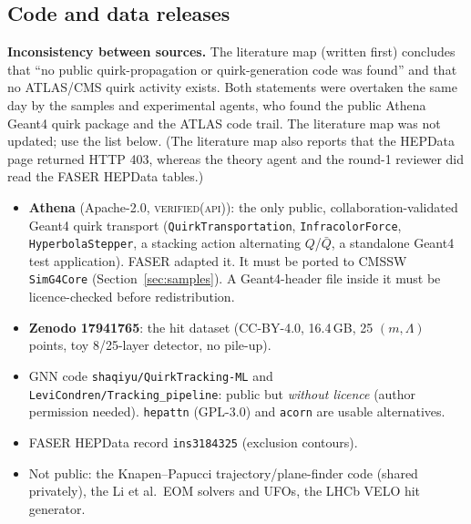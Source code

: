 \documentclass[11pt,a4paper]{article}
\newcommand{\VAPI}{\textsc{verified(api)}}
\DeclareRobustCommand{\file}[1]{\path{#1}}
\begin{document}
\subsection{Code and data releases}
\begin{caution}
\textbf{Inconsistency between sources.} The literature map (written first) concludes that ``no public quirk-propagation or quirk-generation code was found'' and that no ATLAS/CMS quirk activity exists. Both statements were overtaken the same day by the samples and experimental agents, who found the public Athena Geant4 quirk package and the ATLAS code trail. The literature map was not updated; use the list below. (The literature map also reports that the HEPData page returned HTTP 403, whereas the theory agent and the round-1 reviewer did read the FASER HEPData tables.)
\end{caution}
\begin{itemize}
\item \textbf{Athena \file{Simulation/G4Extensions/Quirks}} (Apache-2.0, \VAPI): the only public, collaboration-validated Geant4 quirk transport (\texttt{QuirkTransportation}, \texttt{InfracolorForce}, \texttt{HyperbolaStepper}, a stacking action alternating $Q$/$\bar Q$, a standalone Geant4 test application). FASER adapted it. It must be ported to CMSSW \texttt{SimG4Core} (Section~\ref{sec:samples}). A Geant4-header file inside it must be licence-checked before redistribution.
\item \textbf{Zenodo 17941765}: the \cite{Sha} hit dataset (CC-BY-4.0, 16.4\,GB, 25 $(m,\Lambda)$ points, toy 8/25-layer detector, no pile-up).
\item GNN code \texttt{shaqiyu/QuirkTracking-ML} and \texttt{LeviCondren/Tracking\_pipeline}: public but \emph{without licence} (author permission needed). \texttt{hepattn} (GPL-3.0) and \texttt{acorn} are usable alternatives.
\item FASER HEPData record \texttt{ins3184325} (exclusion contours).
\item Not public: the Knapen--Papucci trajectory/plane-finder code (shared privately), the Li et al.\ EOM solvers and UFOs, the LHCb VELO hit generator.
\end{itemize}
\end{document}
